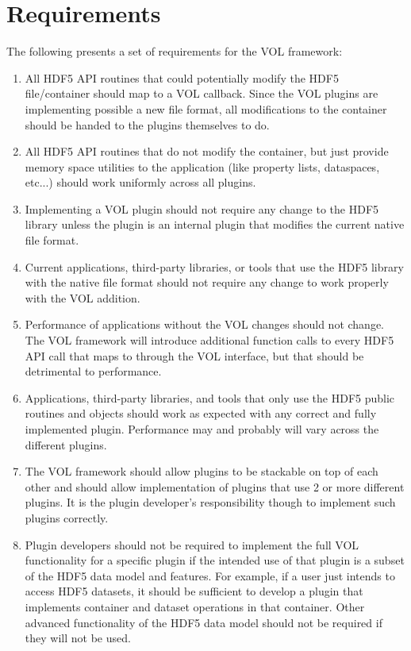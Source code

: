 \documentclass[letterpaper,hyper]{THG_RFC}
\begin{document}
\section{Requirements}
The following presents a set of requirements for the VOL framework:
\begin{enumerate}
\item All HDF5 API routines that could potentially modify the HDF5 file/container should map to a VOL callback. Since the VOL plugins are implementing possible a new file format, all modifications to the container should be handed to the plugins themselves to do.
\item All HDF5 API routines that do not modify the container, but just provide memory space utilities to the application (like property lists, dataspaces, etc...) should work uniformly across all plugins. 
\item Implementing a VOL plugin should not require any change to the HDF5 library unless the plugin is an internal plugin that modifies the current native file format. 
\item Current applications, third-party libraries, or tools that use the HDF5 library with the native file format should not require any change to work properly with the VOL addition.
\item Performance of applications without the VOL changes should not change. The VOL framework will introduce additional function calls to every HDF5 API call that maps to through the VOL interface, but that should be detrimental to performance.
\item Applications, third-party libraries, and tools that only use the HDF5 public routines and objects should work as expected with any correct and fully implemented plugin. Performance may and probably will vary across the different plugins.
\item The VOL framework should allow plugins to be stackable on top of each other and should allow implementation of plugins that use 2 or more different plugins. It is the plugin developer's  responsibility though to implement such plugins correctly.
\item Plugin developers should not be required to implement the full VOL functionality for a specific plugin if the intended use of that plugin is a subset of the HDF5 data model and features. For example, if a user just intends to access HDF5 datasets, it should be sufficient to develop a plugin that implements container and dataset operations in that container. Other advanced functionality of the HDF5 data model should not be required if they will not be used.

\end{enumerate}
\end{document}
